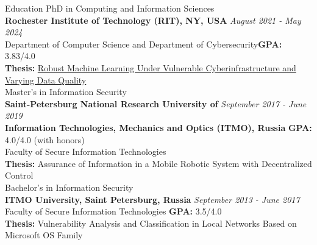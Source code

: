 \documentclass[10pt]{resume} %
\begin{document}
\begin{rSection}{Education}
PhD in Computing and Information Sciences \\
{\bf Rochester Institute of Technology (RIT), NY, USA} \hfill \small{\em August 2021 - May 2024}\normalsize\\ 
Department of Computer Science and Department of Cybersecurity\hfill \small\textbf{GPA:} 3.83/4.0\normalsize\\
\textbf{Thesis:} \href{https://www.proquest.com/openview/e54b39dac756a628c82e402e71182a0d/1?pq-origsite=gscholar&cbl=18750&diss=y}{Robust Machine Learning Under Vulnerable Cyberinfrastructure and Varying Data Quality}\\






\vspace{-0.3cm}
Master's in Information Security \\
{\bf Saint-Petersburg National Research University of} \hfill \small{\em September 2017 - June 2019}\normalsize\\ \textbf{Information Technologies, Mechanics and Optics (ITMO), Russia} \hfill \small\textbf{GPA:} 4.0/4.0 (with honors)\normalsize   
\\ Faculty of Secure Information Technologies\\
\textbf{Thesis:} Assurance of Information in a Mobile Robotic System with Decentralized Control\\


\vspace{-0.3cm}
Bachelor's in Information Security \\
{\bf ITMO University, Saint Petersburg, Russia} \hfill \small{\em September 2013 - June 2017}\normalsize \\ 
Faculty of Secure Information Technologies \hfill \small\textbf{GPA:} 3.5/4.0 \normalsize\\
\textbf{Thesis:} Vulnerability Analysis and Classification in Local Networks Based on Microsoft OS Family\\


\end{rSection}
\end{document}
